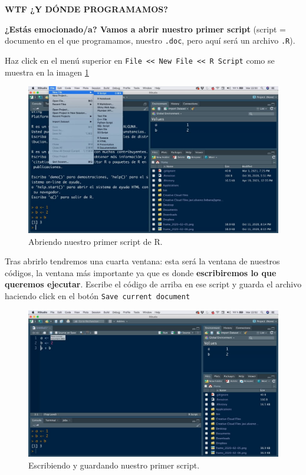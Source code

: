 \documentclass[11pt,]{book}
\begin{document}
\textbf{WTF ¿Y DÓNDE PROGRAMAMOS?}

\textbf{¿Estás emocionado/a? Vamos a abrir nuestro primer script} (script = documento en el que programamos, nuestro \texttt{.doc}, pero aquí será un archivo \texttt{.R}).

Haz click en el menú superior en \texttt{File\ \textless{}\textless{}\ New\ File\ \textless{}\textless{}\ R\ Script} como se muestra en la imagen \ref{fig:inicio-rstudio-5}

\begin{figure}

{\centering \includegraphics[width=0.75\linewidth]{./img/inicio_rstudio_5} 

}

\caption{Abriendo nuestro primer script de R.}\label{fig:inicio-rstudio-5}
\end{figure}

Tras abrirlo tendremos una cuarta ventana: esta será la ventana de nuestros códigos, la ventana más importante ya que es donde \textbf{escribiremos lo que queremos ejecutar}. Escribe el código de arriba en ese script y guarda el archivo haciendo click en el botón \texttt{Save\ current\ document}

\begin{figure}

{\centering \includegraphics[width=0.75\linewidth]{./img/inicio_rstudio_6} 

}

\caption{Escribiendo y guardando nuestro primer script.}\label{fig:inicio-rstudio-6}
\end{figure}
\end{document}
